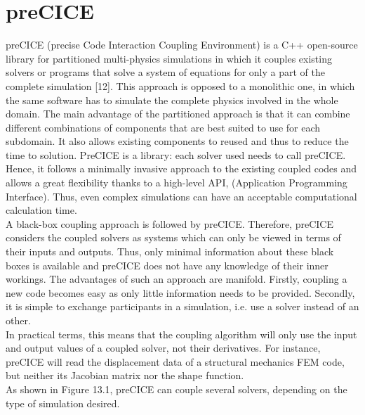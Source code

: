 \documentclass[oneside,11pt,times]{book}
\begin{document}
\section{preCICE}
\indent preCICE (precise Code Interaction Coupling Environment) is a C++ open-source library for partitioned multi-physics simulations in which it couples existing solvers or programs that solve a system of equations for only a part of the complete simulation [12]. This approach is opposed to a monolithic one, in which the same software has to simulate the complete physics involved in the whole domain. The main advantage of the partitioned approach is that it can combine different combinations of components that are best suited to use for each subdomain. It also allows existing components to reused and thus to reduce the time to solution. PreCICE is a library: each solver used needs to call preCICE. Hence, it follows a minimally invasive approach to the existing coupled codes and allows a great flexibility thanks to a high-level API, (Application Programming Interface). Thus, even complex simulations can have an acceptable computational calculation time.\\

A black-box coupling approach is followed by preCICE. Therefore, preCICE considers the coupled solvers as systems which can only be viewed in terms of their inputs and outputs. Thus, only minimal information about these black boxes is available and preCICE does not have any knowledge of their inner workings. The advantages of such an approach are manifold. Firstly, coupling a new code becomes easy as only little information needs to be provided. Secondly, it is simple to exchange participants in a simulation, i.e. use a solver instead of an other.\\

In practical terms, this means that the coupling algorithm will only use the input and output values of a coupled solver, not their derivatives. For instance, preCICE will read the displacement data of a structural mechanics FEM code, but neither its Jacobian matrix nor the shape function.\\

As shown in Figure 13.1, preCICE can couple several solvers, depending on the type of simulation desired.
\end{document}

